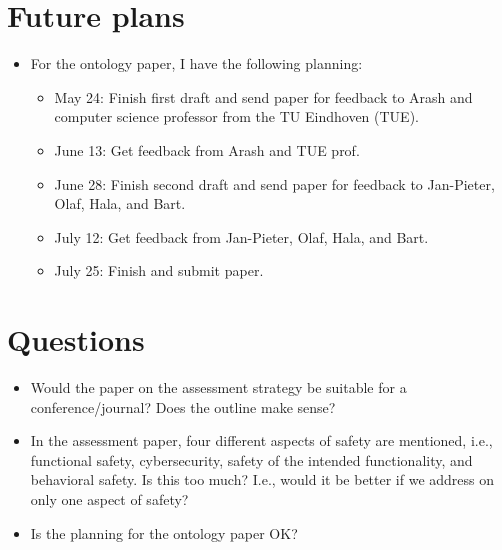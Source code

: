 \documentclass[10pt,final,a4paper,oneside,onecolumn]{article}
\begin{document}
\section{Future plans}

\begin{itemize}
	\item For the ontology paper, I have the following planning:
	\begin{itemize}
		\item May 24: Finish first draft and send paper for feedback to Arash and computer science professor from the TU Eindhoven (TUE).
		\item June 13: Get feedback from Arash and TUE prof.
		\item June 28: Finish second draft and send paper for feedback to Jan-Pieter, Olaf, Hala, and Bart.
		\item July 12: Get feedback from Jan-Pieter, Olaf, Hala, and Bart.
		\item July 25: Finish and submit paper.
	\end{itemize}
\end{itemize}

\section{Questions}

\begin{itemize}
	\item Would the paper on the assessment strategy be suitable for a conference/journal? Does the outline make sense?
	\item In the assessment paper, four different aspects of safety are mentioned, i.e., functional safety, cybersecurity, safety of the intended functionality, and behavioral safety. Is this too much? I.e., would it be better if we address on only one aspect of safety?
	\item Is the planning for the ontology paper OK?
\end{itemize}



\newpage

\end{document}
